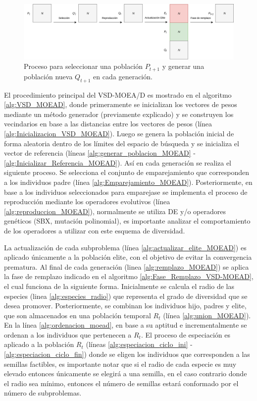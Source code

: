 \begin{figure}[H]
\centering
\scriptsize
\includegraphics[scale=0.2]
{Figures_Chapter4/Evolution_Process_Decomposition.png}
\decoRule
\caption{Proceso para seleccionar una población $P_{t+1}$ y generar una población nueva $Q_{t+1}$  en cada generación.}
\label{fig:Proceso_Generacion_VSD-MOEA_D}
\end{figure}


El procedimiento principal del VSD-MOEA/D es mostrado en el algoritmo \ref{alg:VSD_MOEAD}, donde primeramente se inicializan los vectores de pesos mediante un método generador (previamente explicado) y se construyen los vecindarios en base a las distancias entre los vectores de pesos (línea \ref{alg:Inicializacion_VSD_MOEAD}).
%
Luego se genera la población inicial de forma aleatoria dentro de los límites del espacio de búsqueda y se inicializa el vector de referencia (líneas \ref{alg:generar_poblacion_MOEAD} - \ref{alg:Inicializar_Referencia_MOEAD}).
%
Así en cada generación se realiza el siguiente proceso.
%
Se selecciona el conjunto de emparejamiento que corresponden a los individuos padre (línea \ref{alg:Emparejamiento_MOEAD}).
%
Posteriormente, en base a los individuos seleccionados para emparejase se implementa el proceso de reproducción mediante los operadores evolutivos (línea \ref{alg:reproduccion_MOEAD}), normalmente se utiliza DE y/o operadores genéticos (SBX, mutación polinomial), es importante analizar el comportamiento de los operadores a utilizar con este esquema de diversidad.
%

La actualización de cada subproblema (línea \ref{alg:actualizar_elite_MOEAD}) es aplicado únicamente a la población elite, con el objetivo de evitar la convergencia prematura.
%
Al final de cada generación (linea \ref{alg:remplazo_MOEAD}) se aplica la fase de remplazo indicado en el algoritmo \ref{alg:Fase_Remplazo_VSD-MOEAD}, el cual funciona de la siguiente forma.
%
Inicialmente se calcula el radio de las especies (linea \ref{alg:especies_radio}) que representa el grado de diversidad que se desea promover.
%
Posteriormente, se combinan los individuos hijo, padres y elite, que son almacenados en una población temporal $R_t$ (línea \ref{alg:union_MOEAD}).
%
En la línea \ref{alg:ordenacion_moead}, en base a su aptitud e incrementalmente se ordenan a los individuos que pertenecen a $R_t$.
%
El proceso de especiación es aplicado a la población $R_t$ (líneas \ref{alg:especiacion_ciclo_ini} - \ref{alg:especiacion_ciclo_fin}) donde se eligen los individuos que corresponden a las semillas factibles, es importante notar que si el radio de cada especie es muy elevado entonces únicamente se elegirá a una semilla, en el caso contrario donde el radio sea mínimo, entonces el número de semillas estará conformado por el número de subproblemas.
%

